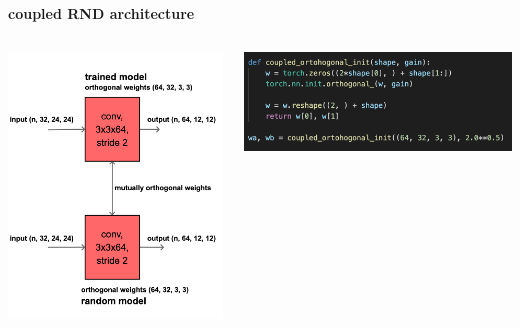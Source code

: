 \documentclass[xcolor=dvipsnames]{beamer}
\begin{document}
\begin{frame}{\bf coupled RND architecture}

\begin{columns}

    \begin{column}{0.5\textwidth}
      \includegraphics[scale=0.18]{../diagrams/rnd/coupledrnd.png}
    \end{column}

    \begin{column}{0.5\textwidth}
      \includegraphics[scale=0.32]{../images/coupled_orthogonal.png}
    \end{column}

\end{columns}

\end{frame}
\end{document}
